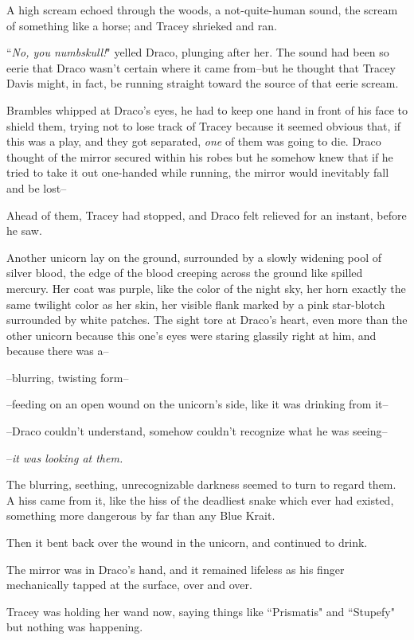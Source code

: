 A high scream echoed through the woods, a not-quite-human sound, the scream of something like a horse; and Tracey shrieked and ran.

``\emph{No, you numbskull!}" yelled Draco, plunging after her. The sound had been so eerie that Draco wasn't certain where it came from\---but he thought that Tracey Davis might, in fact, be running straight toward the source of that eerie scream.

Brambles whipped at Draco's eyes, he had to keep one hand in front of his face to shield them, trying not to lose track of Tracey because it seemed obvious that, if this was a play, and they got separated, \emph{one} of them was going to die. Draco thought of the mirror secured within his robes but he somehow knew that if he tried to take it out one-handed while running, the mirror would inevitably fall and be lost\---

Ahead of them, Tracey had stopped, and Draco felt relieved for an instant, before he saw.

Another unicorn lay on the ground, surrounded by a slowly widening pool of silver blood, the edge of the blood creeping across the ground like spilled mercury. Her coat was purple, like the color of the night sky, her horn exactly the same twilight color as her skin, her visible flank marked by a pink star-blotch surrounded by white patches. The sight tore at Draco's heart, even more than the other unicorn because this one's eyes were staring glassily right at him, and because there was a\---

\---blurring, twisting form\---

\---feeding on an open wound on the unicorn's side, like it was drinking from it\---

\---Draco couldn't understand, somehow couldn't recognize what he was seeing\---

\---\emph{it was looking at them.}

The blurring, seething, unrecognizable darkness seemed to turn to regard them. A hiss came from it, like the hiss of the deadliest snake which ever had existed, something more dangerous by far than any Blue Krait.

Then it bent back over the wound in the unicorn, and continued to drink.

The mirror was in Draco's hand, and it remained lifeless as his finger mechanically tapped at the surface, over and over.

Tracey was holding her wand now, saying things like ``Prismatis" and ``Stupefy" but nothing was happening.

